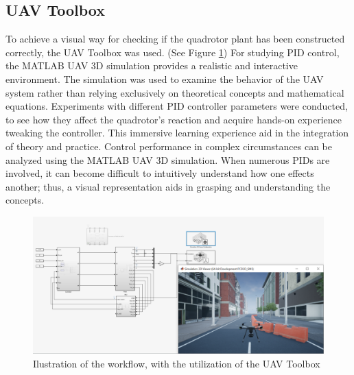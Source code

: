 \subsection{UAV Toolbox}
To achieve a visual way for checking if the quadrotor plant has been constructed correctly, the UAV Toolbox was used. (See Figure \ref{fig:3dsimulation})
For studying PID control, the MATLAB UAV 3D simulation provides a realistic and interactive environment.
The simulation was used to examine the behavior of the UAV system rather than relying exclusively on theoretical concepts and mathematical equations. 
Experiments with different PID controller parameters were conducted, to see how they affect the quadrotor's reaction and acquire hands-on experience tweaking the controller. This immersive learning experience aid in the integration of theory and practice.
Control performance in complex circumstances can be analyzed using the MATLAB UAV 3D simulation. When numerous PIDs are involved, it can become difficult to intuitively understand how one effects another; thus, a visual representation aids in grasping and understanding the concepts.
\begin{figure}[H]
    \begin{center}
    \includegraphics[scale=0.4]{pictures/control/3dsimulation}
    \end{center}
    \caption{Ilustration of the workflow, with the utilization of the UAV Toolbox}
    \label{fig:3dsimulation}
\end{figure}